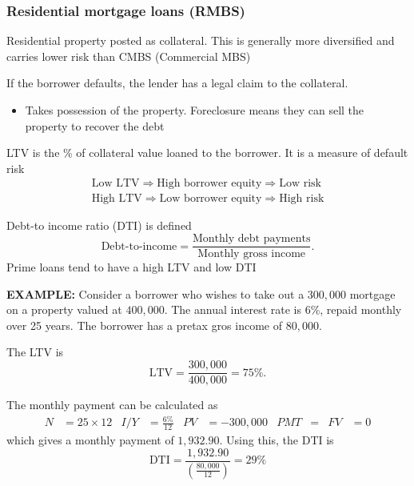 \documentclass[../notes_compiled.tex]{subfiles}
\begin{document}
\subsubsection{Residential mortgage loans (RMBS)}
\begin{itemize}
\item Residential property posted as collateral. This is generally more diversified and carries lower risk than CMBS (Commercial MBS)
\item If the borrower defaults, the lender has a legal claim to the collateral.
\begin{itemize}
\item Takes possession of the property. Foreclosure means they can sell the property to recover the debt
\end{itemize}
\item LTV is the \% of collateral value loaned to the borrower. It is a measure of default risk
\begin{gather*}
\text{Low LTV} \Rightarrow \text{High borrower equity} \Rightarrow \text{Low risk} \\
\text{High LTV} \Rightarrow \text{Low borrower equity} \Rightarrow \text{High risk}
\end{gather*}

\item Debt-to income ratio (DTI) is defined
\begin{equation}
\text{Debt-to-income} = \frac{\text{Monthly debt payments}}{\text{Monthly gross income}}.
\end{equation}
Prime loans tend to have a high LTV and low DTI

{\color{RedViolet}
\item[] \textbf{EXAMPLE:} Consider a borrower who wishes to take out a $300,000$ mortgage on a property valued at $400,000$. The annual interest rate is 6\%, repaid monthly over 25 years. The borrower has a pretax gros income of $80,000$.
}
{\color{RoyalBlue}
\item[] The LTV is
\begin{equation*}
\text{LTV} = \frac{300,000}{400,000} = 75\%.
\end{equation*}

\item[] The monthly payment can be calculated as
\begin{align*}
N&=25\times12  & I / Y &=\frac{6\%}{12} & PV &=-300,000 & PMT &= & FV &=0
\end{align*}
which gives a monthly payment of $1,932.90$. Using this, the DTI is
\begin{equation*}
\text{DTI} = \frac{1,932.90}{\left( \frac{80,000}{12}\right)}=29\%
\end{equation*}
}


\end{itemize}
\end{document}
